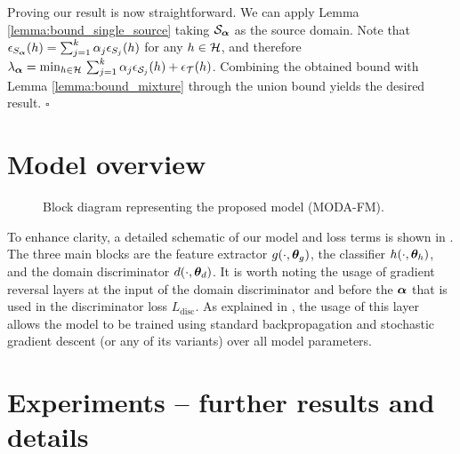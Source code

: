 Proving our result is now straightforward. We can apply Lemma \ref{lemma:bound_single_source} taking ${\mathcal{S}}_{\bm{\alpha}}$ as the source domain. Note that $\epsilon_{S_{\bm{\alpha}}}(h) = \sum_{j=1}^k {\alpha}_j \epsilon_{S_j}(h)$ for any $h \in {\mathcal{H}}$, and therefore $\lambda_{\bm{\alpha}} = \min_{h \in {\mathcal{H}}}\, \sum_{j=1}^k {\alpha}_j\epsilon_{{\mathcal{S}}_j}(h) + \epsilon_{{\mathcal{T}}}(h)$. Combining the obtained bound with Lemma \ref{lemma:bound_mixture} through the union bound yields the desired result. $\square$

\section{Model overview}
\label{sec:model_overview}

\begin{figure}[h!]
	\centering
	\hspace*{-0.30in}
	\scalebox{.69}{}
	\caption{Block diagram representing the proposed model (MODA-FM).}
	\label{fig:model_diagram}
\end{figure}

To enhance clarity, a detailed schematic of our model and loss terms is shown in . The three main blocks are the feature extractor $g(\cdot, {\bm{\theta}}_g)$, the classifier $h(\cdot, {\bm{\theta}}_h)$, and the domain discriminator $d(\cdot, {\bm{\theta}}_d)$. It is worth noting the usage of gradient reversal layers at the input of the domain discriminator and before the ${\bm{\alpha}}$ that is used in the discriminator loss $L_\text{disc}$. As explained in , the usage of this layer allows the model to be trained using standard backpropagation and stochastic gradient descent (or any of its variants) over all model parameters.

\section{Experiments -- further results and details}

